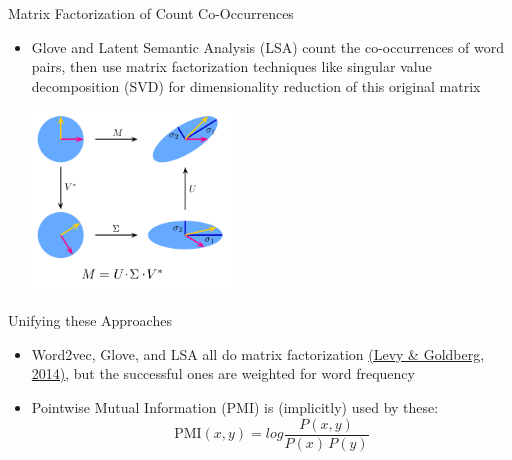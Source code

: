 \documentclass[xcolor=pdftex,x11names,table,hyperref]{beamer}
\begin{document}
\begin{frame}{Matrix Factorization of Count Co-Occurrences}
\begin{itemize}
	\item Glove and Latent Semantic Analysis (LSA) count the co-occurrences of word pairs, then use matrix factorization techniques like singular value decomposition (SVD) for dimensionality reduction of this original matrix \\
		\begin{center}
		\includegraphics[width=0.42\textwidth]{images/singular-value-decomposition_from_wp.png}
		\end{center}
\end{itemize}
\end{frame}

\begin{frame}{Unifying these Approaches}
\begin{itemize}
	\item Word2vec, Glove, and LSA all do matrix factorization \href{https://levyomer.files.wordpress.com/2014/09/neural-word-embeddings-as-implicit-matrix-factorization.pdf}{(Levy \& Goldberg, 2014)}, but the successful ones are weighted for word frequency
	\item Pointwise Mutual Information (PMI) is (implicitly) used by these:
		\begin{equation*}
			\text{PMI}(x,y) = log \frac{P(x,y)}{P(x) \, P(y)}
		\end{equation*}
\end{itemize}
\end{frame}
\end{document}
